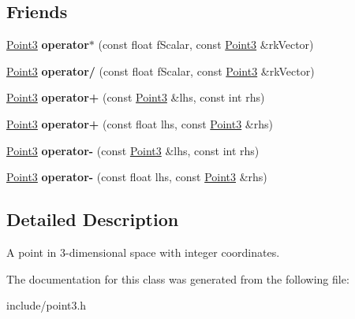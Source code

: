\subsection*{\-Friends}
\begin{DoxyCompactItemize}
\item 
\hypertarget{classPoint3_a5e4538d8674a4a6f1784a8f0f8f0b1f7}{
\hyperlink{classPoint3}{\-Point3} {\bfseries operator$\ast$} (const float f\-Scalar, const \hyperlink{classPoint3}{\-Point3} \&rk\-Vector)}
\label{d4/d36/classPoint3_a5e4538d8674a4a6f1784a8f0f8f0b1f7}

\item 
\hypertarget{classPoint3_aa08360901b4caf40bfb8af3ae69dbd72}{
\hyperlink{classPoint3}{\-Point3} {\bfseries operator/} (const float f\-Scalar, const \hyperlink{classPoint3}{\-Point3} \&rk\-Vector)}
\label{d4/d36/classPoint3_aa08360901b4caf40bfb8af3ae69dbd72}

\item 
\hypertarget{classPoint3_a7863aab5a2a6dd838a41fe7f9961a22c}{
\hyperlink{classPoint3}{\-Point3} {\bfseries operator+} (const \hyperlink{classPoint3}{\-Point3} \&lhs, const int rhs)}
\label{d4/d36/classPoint3_a7863aab5a2a6dd838a41fe7f9961a22c}

\item 
\hypertarget{classPoint3_a986bf039a31264cd0bd3f0624e39590a}{
\hyperlink{classPoint3}{\-Point3} {\bfseries operator+} (const float lhs, const \hyperlink{classPoint3}{\-Point3} \&rhs)}
\label{d4/d36/classPoint3_a986bf039a31264cd0bd3f0624e39590a}

\item 
\hypertarget{classPoint3_a72a66fcbee6da84a1d93de287697ec33}{
\hyperlink{classPoint3}{\-Point3} {\bfseries operator-\/} (const \hyperlink{classPoint3}{\-Point3} \&lhs, const int rhs)}
\label{d4/d36/classPoint3_a72a66fcbee6da84a1d93de287697ec33}

\item 
\hypertarget{classPoint3_a20f6be3bc8a7caf3ba2ae5ac438d61d7}{
\hyperlink{classPoint3}{\-Point3} {\bfseries operator-\/} (const float lhs, const \hyperlink{classPoint3}{\-Point3} \&rhs)}
\label{d4/d36/classPoint3_a20f6be3bc8a7caf3ba2ae5ac438d61d7}

\end{DoxyCompactItemize}


\subsection{\-Detailed \-Description}
\-A point in 3-\/dimensional space with integer coordinates. 

\-The documentation for this class was generated from the following file\-:\begin{DoxyCompactItemize}
\item 
include/point3.\-h\end{DoxyCompactItemize}
